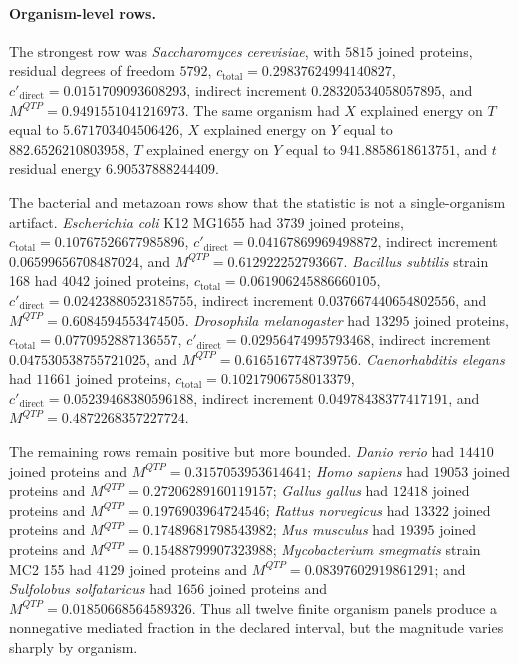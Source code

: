 \paragraph{Organism-level rows.}
The strongest row was \textit{Saccharomyces cerevisiae}, with $5815$ joined proteins, residual degrees of freedom $5792$, $c_{\mathrm{total}}=0.29837624994140827$, $c'_{\mathrm{direct}}=0.0151709093608293$, indirect increment $0.28320534058057895$, and $M^{QTP}=0.9491551041216973$.  The same organism had $X$ explained energy on $T$ equal to $5.671703404506426$, $X$ explained energy on $Y$ equal to $882.6526210803958$, $T$ explained energy on $Y$ equal to $941.8858618613751$, and $t$ residual energy $6.90537888244409$.

The bacterial and metazoan rows show that the statistic is not a single-organism artifact.  \textit{Escherichia coli} K12 MG1655 had $3739$ joined proteins, $c_{\mathrm{total}}=0.10767526677985896$, $c'_{\mathrm{direct}}=0.04167869969498872$, indirect increment $0.06599656708487024$, and $M^{QTP}=0.612922252793667$.  \textit{Bacillus subtilis} strain 168 had $4042$ joined proteins, $c_{\mathrm{total}}=0.061906245886660105$, $c'_{\mathrm{direct}}=0.02423880523185755$, indirect increment $0.037667440654802556$, and $M^{QTP}=0.6084594553474505$.  \textit{Drosophila melanogaster} had $13295$ joined proteins, $c_{\mathrm{total}}=0.0770952887136557$, $c'_{\mathrm{direct}}=0.02956474995793468$, indirect increment $0.047530538755721025$, and $M^{QTP}=0.6165167748739756$.  \textit{Caenorhabditis elegans} had $11661$ joined proteins, $c_{\mathrm{total}}=0.10217906758013379$, $c'_{\mathrm{direct}}=0.05239468380596188$, indirect increment $0.04978438377417191$, and $M^{QTP}=0.4872268357227724$.

The remaining rows remain positive but more bounded.  \textit{Danio rerio} had $14410$ joined proteins and $M^{QTP}=0.3157053953614641$; \textit{Homo sapiens} had $19053$ joined proteins and $M^{QTP}=0.27206289160119157$; \textit{Gallus gallus} had $12418$ joined proteins and $M^{QTP}=0.1976903964724546$; \textit{Rattus norvegicus} had $13322$ joined proteins and $M^{QTP}=0.17489681798543982$; \textit{Mus musculus} had $19395$ joined proteins and $M^{QTP}=0.15488799907323988$; \textit{Mycobacterium smegmatis} strain MC2 155 had $4129$ joined proteins and $M^{QTP}=0.08397602919861291$; and \textit{Sulfolobus solfataricus} had $1656$ joined proteins and $M^{QTP}=0.01850668564589326$.  Thus all twelve finite organism panels produce a nonnegative mediated fraction in the declared interval, but the magnitude varies sharply by organism.

